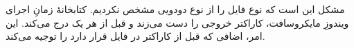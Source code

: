 \section{}
\paragraph{}\label{answer:5}
مشکل این است که نوع فایل را از نوع دودویی  مشخص نکردیم. کتابخانهٔ زمانِ اجرای ویندوزِ مایکروسافت، کاراکتر خروجی را دست می‌زند و قبل از هر  یک  درج می‌کند. این امر،  اضافی که قبل از کاراکتر  در فایل قرار دارد را توجیه می‌کند.

